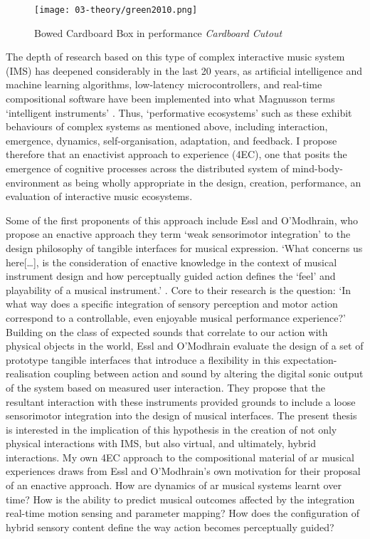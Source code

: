 \begin{wrapfigure}{l}{0.45\textwidth}
    \begin{minipage}{0.95\linewidth}
        \texttt{[image: 03-theory/green2010.png]}
        \captionsetup{justification=justified}
        \caption{Bowed Cardboard Box in performance \textit{Cardboard Cutout} \citep[from][]{green2010}}
    \end{minipage}
    \hfill
\end{wrapfigure}

The depth of research based on this type of complex interactive music system (IMS) has deepened considerably in the last 20 years, as artificial intelligence and machine learning algorithms, low-latency microcontrollers, and real-time compositional software have been implemented into what Magnusson terms `intelligent instruments' \citeyearpar[p. 8]{magnusson2009}. Thus, `performative ecosystems' \citep[]{waters2007} such as these exhibit behaviours of complex systems as mentioned above, including interaction, emergence, dynamics, self-organisation, adaptation, and feedback. I propose therefore that an enactivist approach to experience (4EC), one that posits the emergence of cognitive processes across the distributed system of mind-body-environment as being wholly appropriate in the design, creation, performance, an evaluation of interactive music ecosystems. 

Some of the first proponents of this approach include Essl and O'Modhrain, who propose an enactive approach they term `weak sensorimotor integration' to the design philosophy of tangible interfaces for musical expression. `What concerns us here[…], is the consideration of enactive knowledge in the context of musical instrument design and how perceptually guided action defines the `feel' and playability of a musical instrument.' \citeyearpar[p. 3]{essl2006}. Core to their research is the question: `In what way does a specific integration of sensory perception and motor action correspond to a controllable, even enjoyable musical performance experience?' Building on the class of expected sounds that correlate to our action with physical objects in the world, Essl and O'Modhrain evaluate the design of a set of prototype tangible interfaces that introduce a flexibility in this expectation-realisation coupling between action and sound by altering the digital sonic output of the system based on measured user interaction. They propose that the resultant interaction with these instruments provided grounds to include a loose sensorimotor integration into the design of musical interfaces. The present thesis is interested in the implication of this hypothesis in the creation of not only physical interactions with IMS, but also virtual, and ultimately, hybrid interactions. My own 4EC approach to the compositional material of \gls{ar} musical experiences draws from Essl and O'Modhrain's own motivation for their proposal of an enactive approach. How are dynamics of \gls{ar} musical systems learnt over time? How is the ability to predict musical outcomes affected by the integration real-time motion sensing and parameter mapping? How does the configuration of hybrid sensory content define the way action becomes perceptually guided?

